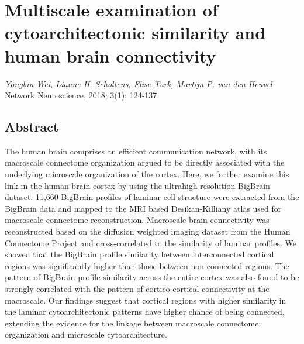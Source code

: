 \pagestyle{MyStyle}

\chapter{Multiscale examination of cytoarchitectonic similarity and human brain connectivity}


\label{ch:bigbrain}

\begin{refsection}

\begin{FlushRight}
\textit{Yongbin Wei, Lianne H. Scholtens, Elise Turk, Martijn P. van den Heuvel}\\
Network Neuroscience, 2018; 3(1): 124-137

\end{FlushRight}
\vspace{20pt}

\newpage
\section*{Abstract}
The human brain comprises an efficient communication network, with its macroscale connectome organization argued to be directly associated with the underlying microscale organization of the cortex. Here, we further examine this link in the human brain cortex by using the ultrahigh resolution BigBrain dataset. 11,660 BigBrain profiles of laminar cell structure were extracted from the BigBrain data and mapped to the MRI based Desikan-Killiany atlas used for macroscale connectome reconstruction. Macroscale brain connectivity was reconstructed based on the diffusion weighted imaging dataset from the Human Connectome Project and cross-correlated to the similarity of laminar profiles. We showed that the BigBrain profile similarity between interconnected cortical regions was significantly higher than those between non-connected regions. The pattern of BigBrain profile similarity across the entire cortex was also found to be strongly correlated with the pattern of cortico-cortical connectivity at the macroscale. Our findings suggest that cortical regions with higher similarity in the laminar cytoarchitectonic patterns have higher chance of being connected, extending the evidence for the linkage between macroscale connectome organization and microscale cytoarchitecture.


\end{refsection}
